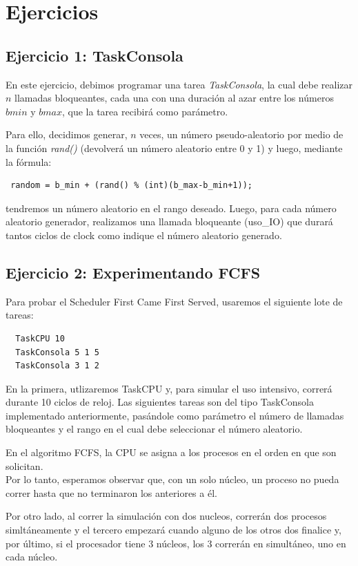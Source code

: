 \section{Ejercicios}

\subsection{Ejercicio 1: TaskConsola}
En este ejercicio, debimos programar una tarea \textit{TaskConsola}, la cual debe realizar $n$ llamadas bloqueantes, cada una con 
una duraci\'on al azar entre los n\'umeros $bmin$ y $bmax$, que la tarea recibir\'a como par\'ametro.

Para ello, decidimos generar, $n$ veces, un n\'umero pseudo-aleatorio por medio de la 
funci\'on \textit{rand()} (devolver\'a un n\'umero aleatorio entre 0 y 1) y luego, mediante la f\'ormula:

\begin{verbatim}
 random = b_min + (rand() % (int)(b_max-b_min+1));
\end{verbatim}

tendremos un n\'umero aleatorio en el rango deseado. 
Luego, para cada n\'umero aleatorio generador, realizamos una llamada bloqueante (uso\_IO) 
que durar\'a tantos ciclos de clock como indique el n\'umero aleatorio generado.

\subsection{Ejercicio 2: Experimentando FCFS}
Para probar el Scheduler First Came First Served, usaremos el siguiente lote de tareas:

\begin{verbatim}
  TaskCPU 10
  TaskConsola 5 1 5
  TaskConsola 3 1 2
\end{verbatim}

En la primera, utlizaremos TaskCPU y, para simular el uso intensivo, correr\'a durante 10 ciclos de reloj.
Las siguientes tareas son del tipo TaskConsola implementado anteriormente, pas\'andole como par\'ametro el n\'umero de llamadas 
bloqueantes y el rango en el cual debe seleccionar el n\'umero aleatorio.

En el algoritmo FCFS, la CPU se asigna a los procesos en el orden en que son solicitan.\\
Por lo tanto, esperamos observar que, con un solo n\'ucleo, un proceso no pueda correr 
hasta que no terminaron los anteriores a \'el.

Por otro lado, al correr la simulaci\'on con dos nucleos, correr\'an dos procesos simlt\'aneamente y el tercero empezar\'a cuando alguno de los otros 
dos finalice y, por \'ultimo, si el procesador tiene 3 n\'ucleos, los 3 correr\'an en simult\'aneo, uno en cada n\'ucleo.

